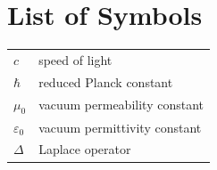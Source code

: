 \chapter{List of Symbols}

\def\arraystretch{1.5}
\begin{longtable}[l]{l l}
    $c$ & speed of light\\
    $\hbar$ & reduced Planck constant\\
    $\mu_{0}$ & vacuum permeability constant\\
    $\varepsilon_{0}$ & vacuum permittivity constant\\
    $\Delta$ & Laplace operator\\
\end{longtable}
\def\arraystretch{1}
